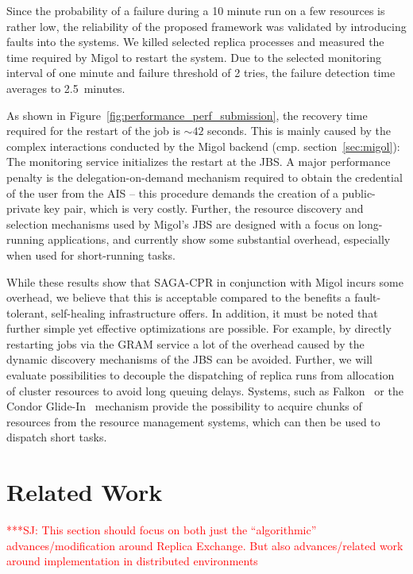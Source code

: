 \documentclass{rspublic}
\newcommand{\jhanote}[1]{ {\textcolor{red} { ***SJ: #1 }}}
\newcommand{\jhanote}[1]{}
\begin{document}
Since the probability of a failure during a 10 minute run on a few
resources is rather low, the reliability of the proposed framework was
validated by introducing faults into the systems. We killed selected
replica processes and measured the time required by Migol to restart
the system.  Due to the selected monitoring interval of one minute and
failure threshold of 2 tries, the failure detection time averages to
2.5\, minutes.

As shown in Figure~\ref{fig:performance_perf_submission}, the recovery
time required for the restart of the job is $\sim42$ seconds. This is
mainly caused by the complex interactions conducted by the Migol
backend (cmp. section~\ref{sec:migol}): The monitoring service
initializes the restart at the JBS.  A major performance penalty is
the delegation-on-demand mechanism required to obtain the credential
of the user from the AIS -- this procedure demands the creation of a
public-private key pair, which is very costly. Further, the resource
discovery and selection mechanisms used by Migol's JBS are designed
with a focus on long-running applications, and currently show some
substantial overhead, especially when used for short-running tasks.


While these results show that SAGA-CPR in conjunction with Migol
incurs some overhead, we believe that this is acceptable compared to
the benefits a fault-tolerant, self-healing infrastructure offers. In
addition, it must be noted that further simple yet effective
optimizations are possible. For example, by directly restarting jobs
via the GRAM service a lot of the overhead caused by the dynamic
discovery mechanisms of the JBS can be avoided. Further, we will
evaluate possibilities to decouple the dispatching of replica runs
from allocation of cluster resources to avoid long queuing
delays. Systems, such as Falkon~\citep{1362680} or the Condor
Glide-In~\citep{citeulike:291860} mechanism provide the possibility to
acquire chunks of resources from the resource management systems,
which can then be used to dispatch short tasks. 


\section{Related Work}


\jhanote{This section should focus on both just the ``algorithmic''
  advances/modification around Replica Exchange. But also
  advances/related work around  implementation in distributed
  environments}
                       
\end{document}
